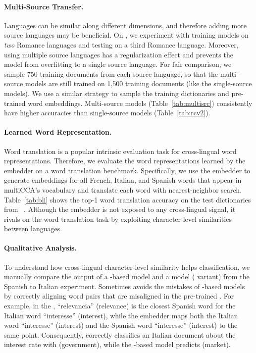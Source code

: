 \paragraph{Multi-Source Transfer.}
Languages can be similar along different dimensions, and therefore adding more
source languages may be beneficial.
On , we experiment with training \name{} models on \emph{two} Romance
languages and testing on a third Romance language.
Moreover, using multiple source languages has a regularization
effect and prevents the model from overfitting to a single source language.
For fair comparison, we sample 750 training documents from each source
language, so that the multi-source models are still trained on 1,500 training
documents (like the single-source models).  We use a similar strategy to sample
the training dictionaries and pre-trained word embeddings.  Multi-source models
(Table~\ref{tab:multisrc}) consistently have higher accuracies than single-source models
(Table~\ref{tab:rcv2}).

\paragraph{Learned Word Representation.}
Word translation is a popular intrinsic evaluation task for cross-lingual 
word representations.
Therefore, we evaluate the word representations learned by the 
embedder on a word translation benchmark.
Specifically, we use the  embedder to generate embeddings for all
French, Italian, and Spanish words that appear in multiCCA's vocabulary and 
translate each word with nearest-neighbor search.
Table~\ref{tab:bli} shows the top-1 word translation accuracy on the test
dictionaries from ~\citep{conneau-18}.
Although the  embedder is not exposed to any cross-lingual signal, it
rivals  on the word translation task by exploiting character-level
similarities between languages.

\paragraph{Qualitative Analysis.}
To understand how cross-lingual character-level similarity helps
classification, we manually compare the output of a -based model and
a \name{} model ( variant) from the Spanish to Italian 
experiment.
Sometimes \name{} avoids the mistakes of -based models by correctly
aligning word pairs that are misaligned in the pre-trained .
For example, in the , ``relevancia'' (relevance) is the closest
Spanish word for the Italian word ``interesse'' (interest), while the
 embedder maps both the Italian word ``interesse'' (interest) and the
Spanish word ``interesse'' (interest) to the same point.  Consequently,
 correctly classifies an Italian document about the interest rate
with  (government), while the -based model predicts
 (market).
